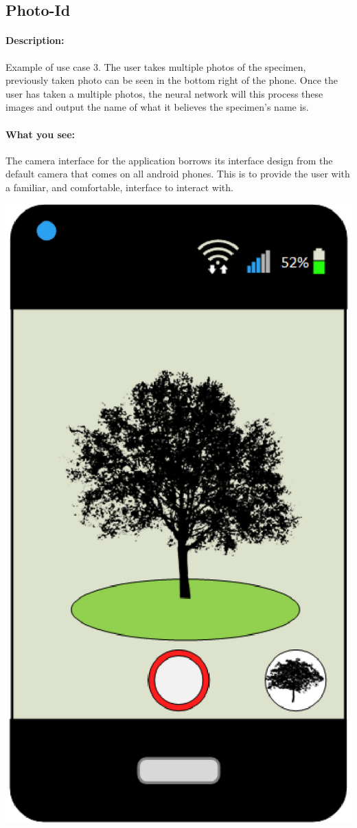 \documentclass[a4paper]{article}
\begin{document}
\subsection{Photo-Id}
\paragraph{Description:}
Example of use case 3. The user takes multiple photos of the specimen, previously taken photo can be seen in the bottom right of the phone.
Once the user has taken a multiple photos, the neural network will this process these images and output the name of what it believes the specimen's name is.
\paragraph{What you see:}The camera interface for the application borrows its interface design from the default camera that comes on all android phones. This is to provide the user with a familiar, and comfortable, interface to interact with.
\begin{center}\includegraphics[scale=.8]{Photo-Id.eps}\end{center}
\pagebreak
\end{document}

